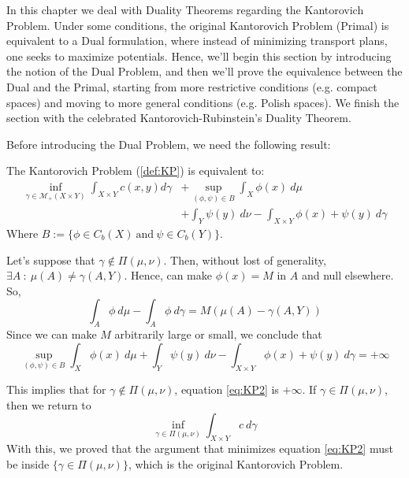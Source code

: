 In this chapter we deal with Duality Theorems regarding the Kantorovich Problem.
Under some conditions, the original Kantorovich Problem (Primal) is equivalent to a Dual
formulation, where instead of minimizing transport plans, one seeks to maximize potentials.
Hence, we'll begin this section by introducing the notion of the Dual Problem, and then we'll prove the
equivalence between the Dual and the Primal, starting from more restrictive conditions (e.g. compact spaces)
and moving to more general conditions (e.g. Polish spaces). We finish the section with the celebrated
Kantorovich-Rubinstein's Duality Theorem.

Before introducing the Dual Problem, we need the following result:
\begin{lemma}

  The Kantorovich Problem (\ref{def:KP}) is equivalent to:
\begin{align}
  \inf_{\gamma \in \mathcal M_+(X\times Y)}
  \int_{X \times Y} c(x,y)d\gamma &+
  \sup_{(\phi,\psi) \in B}
  \int_X \phi(x) \ d\mu
  \nonumber
  \\
  &+ \int_Y \psi(y) \ d\nu
  - \int_{X\times Y} \phi(x) + \psi(y) \ d\gamma
  \label{eq:KP2}
\end{align}
Where $B := \{\phi \in C_b(X) \ \mathrm{and} \ \psi \in C_b(Y)\}$.
\end{lemma}
\begin{prf}
  Let's suppose that $\gamma \notin \Pi(\mu,\nu)$.
  Then, without lost of generality, $\exists A \ : \ \mu(A) \neq
    \gamma(A,Y)$. Hence, can make $\phi(x) = M$ in $A$ and null elsewhere.
  So,
  \begin{equation*}
    \int_A \phi \ d\mu - \int_A \phi \ d\gamma	= M(\mu(A)-\gamma(A,Y))
  \end{equation*}
  Since we can make $M$ arbitrarily large or small, we conclude that
  \begin{equation*}
    \sup_{(\phi,\psi) \in B}
    \int_X \phi(x) \ d\mu + \int_Y \psi(y) \ d\nu -
    \int_{X\times Y} \phi(x) + \psi(y) \ d\gamma = +\infty
  \end{equation*}

  This implies that for $\gamma \notin \Pi(\mu,\nu)$, equation \eqref{eq:KP2}
  is $+\infty$. If $\gamma \in \Pi(\mu,\nu)$, then we return to
  \begin{equation*}
    \inf_{\gamma \in \Pi(\mu,\nu)} \int_{X\times Y} c \ d\gamma
  \end{equation*}
  With this, we proved that the argument that minimizes
  equation \eqref{eq:KP2} must
  be inside $\{\gamma \in \Pi(\mu,\nu)\}$, which is the original Kantorovich
  Problem.
\end{prf}

